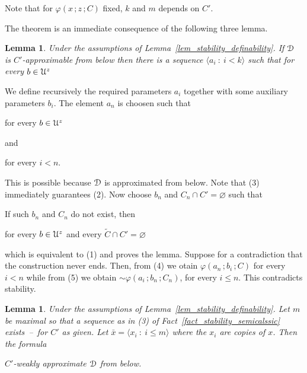 \documentclass{amsproc}
\makeatletter
\newcounter{thm}
\theoremstyle{mio}
\newtheorem{lemma}[thm]{Lemma}\tcolorboxenvironment{lemma}{mythm}
\providecommand{\proofNameStyle}{\bfseries}
\renewenvironment{proof}[1][\proofname]{\par
  \pushQED{\qed}%
  \normalfont%
  \trivlist
  \item[\hskip\labelsep
        \proofNameStyle
    #1\@addpunct{.}]\ignorespaces
}{%
  \popQED\endtrivlist\@endpefalse
}
\makeatother
\begin{document}
Note that for $\varphi(x\,;z\,;C)$ fixed, $k$ and $m$ depends on $C'$. 

\begin{proof}
  The theorem is an immediate consequence of the following three lemma.
\end{proof}

\begin{lemma}
  Under the assumptions of Lemma~\ref{lem_stability_definability}.
  If ${\EuScript D}$ is $C'$-approximable from below then there is a sequence $\langle a_i\ :\ i<k\rangle$ such that for every $b\in{\EuScript U}^z$\medskip

  \medskip 

\end{lemma}

\begin{proof}
We define recursively the required parameters $a_i$ together with some auxiliary parameters $b_i$.
The element $a_n$ is choosen such that

\hfill for every $b\in{\EuScript U}^z$

and

\hfill for every $i<n$.\smallskip

This is possible because ${\EuScript D}$ is approximated from below.
Note that (3) immediately guarantees (2).
Now choose $b_n$ and $C_n\cap C'=\varnothing$ such that


If such $b_n$ and $C_n$ do not exist, then 

\hfill for every $b\in{\EuScript U}^z$ and every $\tilde C\cap C'=\varnothing$%

which is equivalent to (1) and proves the lemma.
Suppose for a contradiction that the construction never ends.
Then, from (4) we otain $\varphi(a_n\,;b_i\,;C)$ for every $i<n$ while from (5) we obtain ${\sim}\varphi(a_i\,;b_n\,;C_n)$, for every $i\le n$.
This contradicts stability.
\end{proof}

\begin{lemma}
  Under the assumptions of Lemma~\ref{lem_stability_definability}.
  Let $m$ be maximal so that a sequence as in (3) of Fact~\ref{fact_stability_semicalssic} exists~--~for $C'$ as given.
  Let $\bar x=\langle x_i\ :\ i\le m\rangle$ where the $x_i$ are copies of $x$.
  Then the formula\medskip


  $C'$-weakly approximate ${\EuScript D}$ from below.
\end{lemma}
\end{document}

